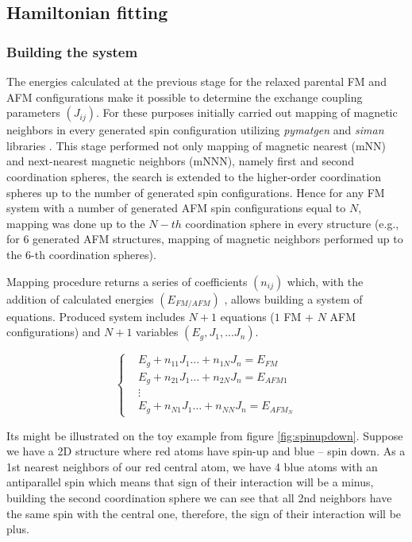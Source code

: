 \subsection{Hamiltonian fitting}

\subsubsection{Building the system}
The energies calculated at the previous stage for the relaxed parental FM and AFM configurations make it possible to determine the exchange coupling parameters $(J_{ij})$. For these purposes initially carried out mapping of magnetic neighbors in every generated spin configuration utilizing \textit{pymatgen} \cite{Ong:2013vd} and \textit{siman} \cite{Aksyonov_2018} libraries . This stage performed not only mapping of magnetic nearest (mNN) and next-nearest magnetic neighbors (mNNN), namely first and second coordination spheres, the search is extended to the higher-order coordination spheres up to the number of generated spin configurations.
Hence for any FM system with a number of generated AFM spin configurations equal to $N$, mapping was done up to the $N-th$ coordination sphere in every structure (e.g., for 6 generated AFM structures, mapping of magnetic neighbors performed up to the 6-th coordination spheres).

Mapping procedure returns a series of coefficients $(n_{ij})$ which, with the addition of calculated energies $(E_{FM/AFM})$ , allows building a system of equations. Produced system includes $N + 1$ equations ($1$ FM + $N$ AFM configurations) and $N + 1$ variables $(E_g, J_1, ... J_n)$. 

\begin{equation}
  \left\{
    \begin{aligned}
      & E_g + n_{11}J_1 \hdots + n_{1N} J_n = E_{FM}\\
      & E_g + n_{21}J_1 \hdots + n_{2N} J_n = E_{AFM1}\\
      &\vdots\\
      & E_g + n_{N1} J_1 \hdots + n_{NN}J_n = E_{AFM_N}
    \end{aligned}
  \right.
\end{equation}


Its might be illustrated on the toy example from figure \ref{fig:spinupdown}. Suppose we have a 2D structure where red atoms have spin-up and blue – spin down.  As a 1st nearest neighbors of our red central atom, we have 4 blue atoms with an antiparallel spin which means that sign of their interaction will be a minus, building the second coordination sphere we can see that all 2nd neighbors have the same spin with the central one, therefore, the sign of their interaction will be plus. 

